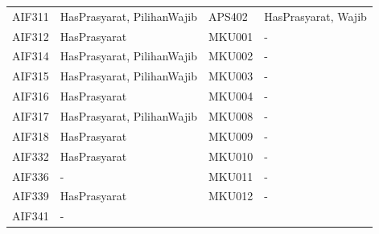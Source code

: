 \begin{enumerate}
\begin{table}[H]
\begin{tabular}{|p{2.125cm}|p{4.5cm}|p{2.125cm}|p{4.5cm}|}
    AIF311  & HasPrasyarat, PilihanWajib &    APS402  & HasPrasyarat, Wajib        \\
    AIF312  & HasPrasyarat               &    MKU001  & -                          \\
    AIF314  & HasPrasyarat, PilihanWajib &    MKU002  & -                          \\
    AIF315  & HasPrasyarat, PilihanWajib &    MKU003  & -                          \\
    AIF316  & HasPrasyarat               &    MKU004  & -                          \\
    AIF317  & HasPrasyarat, PilihanWajib &    MKU008  & -                          \\
    AIF318  & HasPrasyarat               &    MKU009  & -                          \\
    AIF332  & HasPrasyarat               &    MKU010  & -                          \\
    AIF336  & -                          &    MKU011  & -                          \\
    AIF339  & HasPrasyarat               &    MKU012  & -                          \\
    AIF341  & -                          &            &           				   \\
		\hline
    \end{tabular}
		
	\label{tab:2_kelas_matakuliah}
\end{table}

\end{enumerate}
